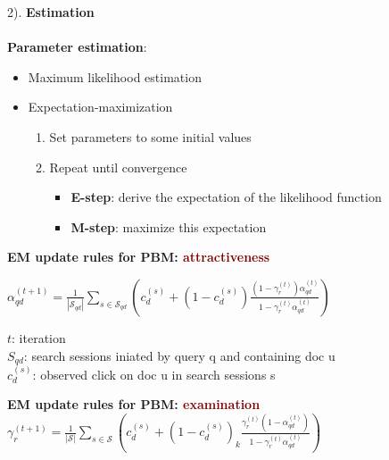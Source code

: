 \vspace{1cm}

{\huge 2). \textbf{Estimation} } \\
\\
\textbf{Parameter estimation}:
\begin{itemize}
    \setlength\itemsep{0em}
    \item Maximum likelihood estimation
    \item Expectation-maximization
    \begin{enumerate}
        \setlength\itemsep{0em}
        \item Set parameters to some initial values
        \item Repeat until convergence 
        \begin{itemize}
        \setlength\itemsep{0em}
            \item \textbf{E-step}: derive the expectation of the likelihood function
            \item \textbf{M-step}: maximize this expectation
        \end{itemize}
    \end{enumerate}
\end{itemize}

\vspace{0.5cm}

\textbf{EM update rules for PBM: \textcolor{Maroon}{attractiveness}} \\
\begin{minipage}{0.7\textwidth}
$ \alpha_{q d}^{(t+1)}=\frac{1}{\left|\mathcal{S}_{q d}\right|} \sum_{s \in \mathcal{S}_{q d}}\left(c_{d}^{(s)}+\left(1-c_{d}^{(s)}\right) \frac{\left(1-\gamma_{r}^{(t)}\right) \alpha_{q d}^{(t)}}{1-\gamma_{r}^{(t)} \alpha_{q d}^{(t)}}\right) $
\end{minipage}
\begin{minipage}{0.4\textwidth}
$t$: iteration \\
$S_{qd}$: search sessions iniated by query q and containing doc u \\
$c^{(s)}_d$: observed click on doc u in search sessions s
\end{minipage}

\vspace{0.5cm}

\textbf{EM update rules for PBM: \textcolor{Maroon}{examination}} \\
$ \gamma_{r}^{(t+1)}=\frac{1}{|\mathcal{S}|} \sum_{s \in \mathcal{S}}\left(c_{d}^{(s)}+\left(1-c_{d}^{(s)}\right)_{k} \frac{\gamma_{r}^{(t)}\left(1-\alpha_{q d}^{(t)}\right)}{1-\gamma_{r}^{(t)} \alpha_{q d}^{(t)}}\right) $

